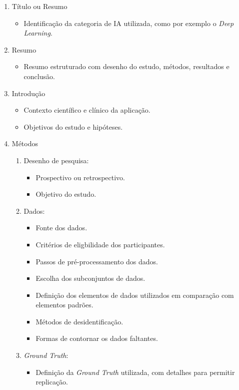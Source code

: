 \begin{enumerate}
    \item Título ou Resumo
    \begin{itemize}
        \item Identificação da categoria de IA utilizada, como por exemplo o \textit{Deep Learning}.
    \end{itemize}
    \item Resumo
    \begin{itemize}
        \item Resumo estruturado com desenho do estudo, métodos, resultados e conclusão.
    \end{itemize}
    \item Introdução
    \begin{itemize}
        \item Contexto científico e clínico da aplicação.
        \item Objetivos do estudo e hipóteses.
    \end{itemize}
    \item Métodos
    \begin{enumerate}
        \item Desenho de pesquisa:
        \begin{itemize}
            \item Prospectivo ou retrospectivo.
            \item Objetivo do estudo.
        \end{itemize}
        \item Dados:
        \begin{itemize}
            \item Fonte dos dados.
            \item Critérios de eligbilidade dos participantes.
            \item Passos de pré-processamento dos dados.
            \item Escolha dos subconjuntos de dados.
            \item Definição dos elementos de dados utilizados em comparação com elementos padrões.
            \item Métodos de desidentificação.
            \item Formas de contornar os dados faltantes.
        \end{itemize}
        \item \textit{Ground Truth}:
        \begin{itemize}
            \item Definição da \textit{Ground Truth} utilizada, com detalhes para permitir replicação.

\end{itemize}
\end{enumerate}
\end{enumerate}
